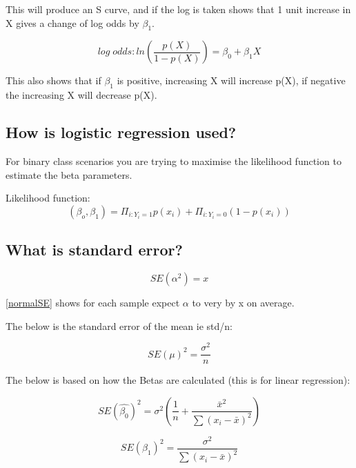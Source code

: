 \documentclass[11pt]{scrartcl} %
\begin{document}
This will produce an S curve, and if the log is taken shows that 1 unit increase in X gives a change of log odds by 
\( \beta_1\).

\begin{equation}
	log\; odds: ln(\frac{p(X)}{1-p(X)}) = \beta_0 + \beta_1X
\end{equation}

This also shows that if \(\beta_1\) is positive, increasing X will increase p(X), if negative the increasing X will
decrease p(X).

\subsection{How is logistic regression used?}

For binary class scenarios you are trying to maximise the likelihood function to estimate the beta parameters.

Likelihood function:
\begin{equation}
	(\beta_o,\beta_1) = \Pi_{i:Y_i=1}p(x_i) + \Pi_{i:Y_i=0}(1-p(x_i))
\end{equation}

\subsection{What is standard error?}

\begin{equation}
	SE(\alpha^2) = x
	\label{normalSE}
\end{equation}

\ref{normalSE} shows for each sample expect \(\alpha\) to very by x on average.

The below is the standard error of the mean ie std/n:

\begin{equation}
	SE(\mu)^2 = \frac{\sigma^2}{n}
\end{equation}

The below is based on how the Betas are calculated (this is for linear regression):

\begin{equation}
	SE(\hat{\beta_0})^2 = \sigma^2(\frac{1}{n} + \frac{\bar{x}^2}{\sum{(x_i-\bar{x})^2}})
\end{equation}

\begin{equation}
	SE(\beta_1)^2 = \frac{\sigma^2}{\sum{(x_i-\bar{x})^2}}
\end{equation}
\end{document}
